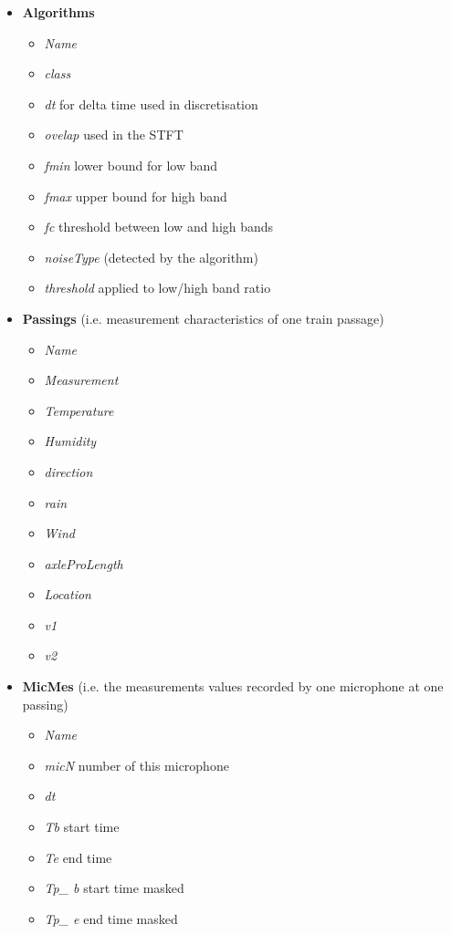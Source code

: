 \documentclass{article}\usepackage[]{graphicx}\usepackage[]{color}
\begin{document}
\begin{itemize}
\item {\bf Algorithms}
  \begin{itemize}
    \item {\it Name}
    \item {\it class}
    \item {\it dt} for delta time used in discretisation
    \item {\it ovelap} used in the STFT
    \item {\it fmin} lower bound for low band
    \item {\it fmax} upper bound for high band
    \item {\it fc} threshold between low and high bands
    \item {\it noiseType} (detected by the algorithm)
    \item {\it threshold} applied to low/high band ratio
  \end{itemize}
\item {\bf Passings} (i.e. measurement characteristics of one train passage)
  \begin{itemize}
    \item {\it Name}
    \item {\it Measurement}
    \item {\it Temperature}
    \item {\it Humidity}
    \item {\it direction}
    \item {\it rain}
    \item {\it Wind}
    \item {\it axleProLength}
    \item {\it Location}
    \item {\it v1}
    \item {\it v2}
  \end{itemize}
\item {\bf MicMes} (i.e. the measurements values recorded by one microphone at one passing)
  \begin{itemize}
    \item {\it Name}
    \item {\it micN} number of this microphone    
    \item {\it dt}
    \item {\it Tb} start time
    \item {\it Te} end time
    \item {\it Tp\_ b} start time masked
    \item {\it Tp\_ e} end time masked

\end{itemize}
\end{itemize}
\end{document}
